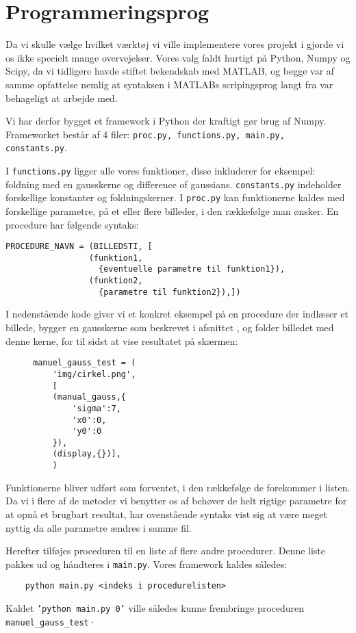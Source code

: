 \thispagestyle{plain}
\section{Programmeringsprog}
\pagestyle{headings}
Da vi skulle vælge hvilket værktøj vi ville implementere vores projekt i gjorde vi os ikke specielt mange overvejelser. 
Vores valg faldt hurtigt på Python, Numpy og Scipy, da vi tidligere havde stiftet bekendskab med MATLAB, og begge var af samme opfattelse nemlig
at syntaksen i MATLABs scripingsprog langt fra var behageligt at arbejde med.


Vi har derfor bygget et framework i Python der kraftigt gør brug af Numpy. Frameworket består af 4 filer: \texttt{proc.py, functions.py, main.py, constants.py}.

I \texttt{functions.py} ligger alle vores funktioner, disse inkluderer for eksempel: foldning med en gausskerne og difference of gaussians.
\texttt{constants.py} indeholder forskellige konstanter og foldningskerner. I \texttt{proc.py} kan funktionerne kaldes med forskellige parametre, på et eller flere billeder, i den rækkefølge man ønsker.
En procedure har følgende syntaks:
\begin{verbatim}
PROCEDURE_NAVN = (BILLEDSTI, [
                 (funktion1,
                   {eventuelle parametre til funktion1}),
                 (funktion2,
                   {parametre til funktion2}),])
\end{verbatim}
I nedenstående kode giver vi et konkret eksempel på en procedure der indlæser et billede, bygger en gausskerne som beskrevet i afsnittet , og folder billedet med denne kerne, for til sidst at vise resultatet på skærmen:
\begin{figure}[H]
\begin{verbatim}
manuel_gauss_test = ( 
    'img/cirkel.png',
    [
    (manual_gauss,{
        'sigma':7,
        'x0':0,
        'y0':0
    }),
    (display,{})],
    )
\end{verbatim}
\end{figure}
Funktionerne bliver udført som forventet, i den rækkefølge de forekommer i listen.
Da vi i flere af de metoder vi benytter os af behøver de helt rigtige parametre for at opnå et brugbart resultat, har ovenstående syntaks vist sig at være meget nyttig da alle parametre ændres i samme fil.

Herefter tilføjes proceduren til en liste af flere andre procedurer. Denne liste pakkes ud og håndteres i \texttt{main.py}. Vores framework kaldes således: 
\begin{verbatim}
	python main.py <indeks i procedurelisten>
\end{verbatim}
Kaldet \texttt{'python main.py 0'} ville således kunne frembringe proceduren\\ \texttt{manuel\_gauss\_test}·

